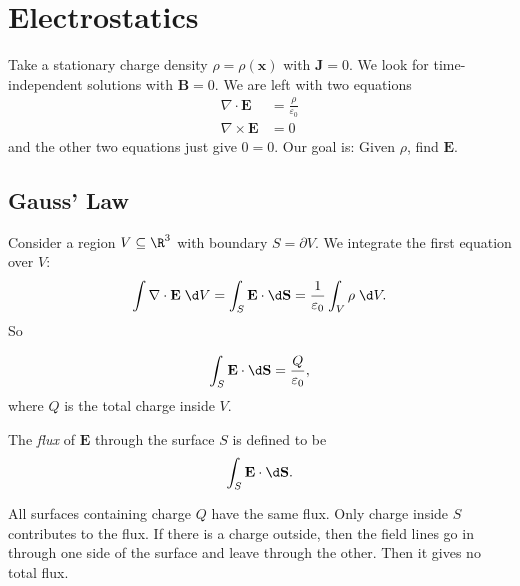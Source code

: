 \documentclass[a4paper]{article}
\begin{document}
\section{Electrostatics}
Take a stationary charge density $\rho = \rho(\mathbf{x})$ with $\mathbf{J} = 0$. We look for time-independent solutions with $\mathbf{B} = 0$. We are left with two equations
\begin{align*}
  \nabla \cdot \mathbf{E} &= \frac{\rho}{\varepsilon_0}\\
  \nabla\times \mathbf{E} &= 0
\end{align*}
and the other two equations just give $0 = 0$. Our goal is: Given $\rho$, find $\mathbf{E}$.
\subsection{Gauss' Law}
Consider a region $V\subseteq \R^3$ with boundary $S = \partial V$. We integrate the first equation over $V$:
\[
  \int \nabla\cdot \mathbf{E}\; \d V = \int_S \mathbf{E}\cdot \d \mathbf{S} = \frac{1}{\varepsilon_0} \int_V \rho \;\d V.
\]
So
\begin{law}
  \[
    \int_S \mathbf{E}\cdot \d \mathbf{S} =\frac{Q}{\varepsilon_0},
  \]
  where $Q$ is the total charge inside $V$.
\end{law}
\begin{defi}
  The \emph{flux} of $\mathbf{E}$ through the surface $S$ is defined to be 
  \[
    \int_S \mathbf{E} \cdot\d \mathbf{S}.
  \]
\end{defi}

\note All surfaces containing charge $Q$ have the same flux. Only charge inside $S$ contributes to the flux. If there is a charge outside, then the field lines go in through one side of the surface and leave through the other. Then it gives no total flux.
\end{document}
